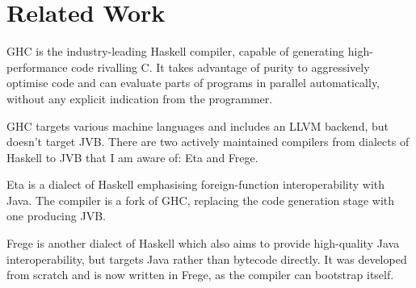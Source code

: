 \documentclass[dissertation.tex]{subfiles}
\begin{document}
\section{Related Work}
{

    GHC is the industry-leading Haskell compiler, capable of generating high-performance code rivalling C. It takes
    advantage of purity to aggressively optimise code and can evaluate parts of programs in parallel automatically,
    without any explicit indication from the programmer.

    GHC targets various machine languages and includes an LLVM backend, but doesn't target JVB. There are two actively
    maintained compilers from dialects of Haskell to JVB that I am aware of: Eta and Frege.


    Eta is a dialect of Haskell emphasising foreign-function interoperability with Java. The  compiler is
    a fork of GHC, replacing the code generation stage with one producing JVB.

    Frege is another dialect of Haskell which also aims to provide high-quality Java interoperability, but targets Java
    rather than bytecode directly. It was developed from scratch and is now written in Frege, as the compiler can
    bootstrap itself.

}
\end{document}
